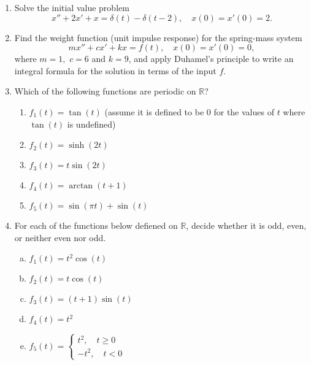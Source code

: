 \documentclass[11 pt]{article}
\newcommand{\R}{\mathbb{R}}
\begin{document}
\begin{enumerate}
\item Solve the initial value problem
\begin{equation}
    x''+2x'+x=\delta(t)-\delta(t-2), \quad x(0)=x'(0)=2.
\end{equation}


\item Find the weight function (unit impulse response)  for the spring-mass system
\begin{equation}
    mx''+cx'+kx=f(t), \quad x(0)=x'(0)=0,
\end{equation}
where $m=1, $ $c=6$ and $k=9$,
and apply Duhamel's principle to write an integral formula for the solution in terms of the input $f$.

\item Which of the following functions are periodic on $\R$?
\begin{enumerate}
    \item $f_1(t)=\tan(t)$ (assume it is defined to be $0$ for the values of $t$ where $\tan(t)$ is undefined)
    \item $f_2(t)=\sinh(2t)$
    \item $f_3(t)=t\sin(2t)$
    \item $f_4(t)=\arctan(t+1)$
    \item $f_5(t)=\sin(\pi t)+\sin(t)$
\end{enumerate}



\item For each of the functions below defiened on $\mathbb{R}$, decide whether it is odd, even, or neither even nor odd.
\begin{enumerate}[(a)]
    \item $f_1(t)=t^2\cos(t)$
    \item $f_2(t)=t\cos(t)$
    \item $f_3(t)=(t+1)\sin(t)$
    \item $f_4(t)=t^2$
    \item $f_5(t)=\begin{cases}
        t^2,\quad t\geq 0\\
        -t^2,\quad t<0
    \end{cases}$
\end{enumerate}





\end{enumerate}
\end{document}
